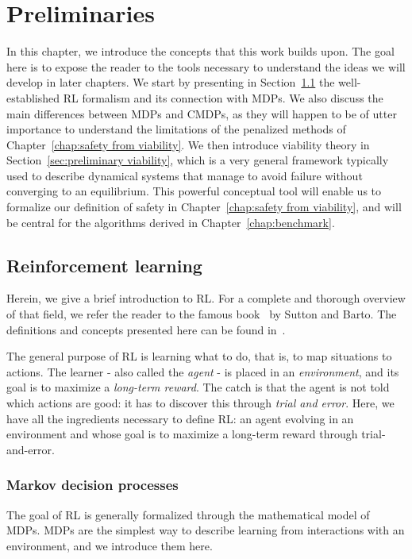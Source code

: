 \chapter{Preliminaries} \label{chap:prelim}

	In this chapter, we introduce the concepts that this work builds upon. The goal here is to expose the reader to the tools necessary to understand the ideas we will develop in later chapters. We start by presenting in Section~\ref{sec:preliminary RL} the well-established RL formalism and its connection with MDPs. We also discuss the main differences between MDPs and CMDPs, as they will happen to be of utter importance to understand the limitations of the penalized methods of Chapter~\ref{chap:safety from viability}. We then introduce viability theory in Section~\ref{sec:preliminary viability}, which is a very general framework typically used to describe dynamical systems that manage to avoid failure without converging to an equilibrium. This powerful conceptual tool will enable us to formalize our definition of safety in Chapter~\ref{chap:safety from viability}, and will be central for the algorithms derived in Chapter~\ref{chap:benchmark}.
	
	\section{Reinforcement learning} \label{sec:preliminary RL}
		Herein, we give a brief introduction to RL. For a complete and thorough overview of that field, we refer the reader to the famous book~\cite{sutton2018reinforcement} by Sutton and Barto. The definitions and concepts presented here can be found in~\cite[Chapter\,3]{sutton2018reinforcement}.\par
		The general purpose of RL is learning what to do, that is, to map situations to actions. The learner - also called the\emph{ agent} - is placed in an\emph{ environment}, and its goal is to maximize a\emph{ long-term reward}. The catch is that the agent is not told which actions are good: it has to discover this through\emph{ trial and error}. Here, we have all the ingredients necessary to define RL: an agent evolving in an environment and whose goal is to maximize a long-term reward through trial-and-error. 
		
		\subsection{Markov decision processes} \label{sec:preliminary mdps}
			The goal of RL is generally formalized through the mathematical model of MDPs. MDPs are the simplest way to describe learning from interactions with an environment, and we introduce them here.
